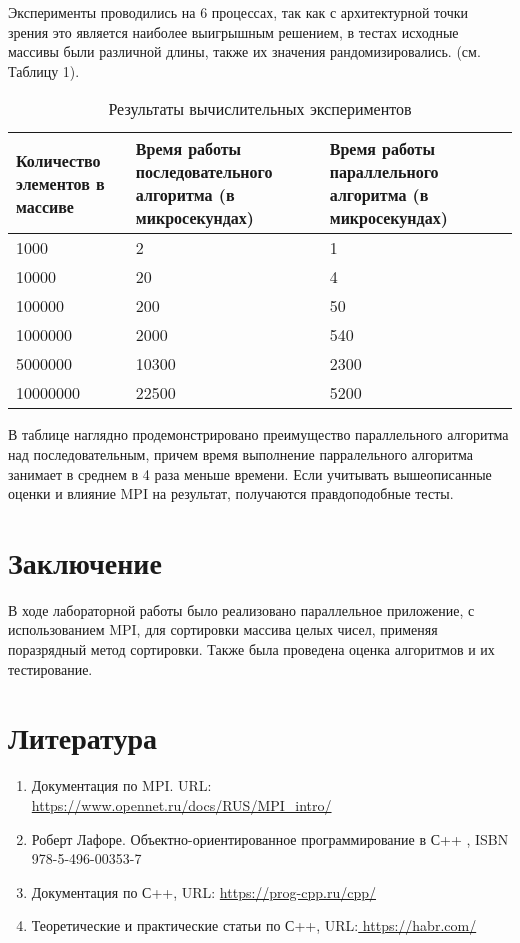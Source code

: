 \documentclass{report}
\begin{document}
\par Эксперименты проводились на 6 процессах, так как с архитектурной точки зрения это является наиболее выигрышным решением, в тестах исходные массивы были различной длины, также их значения рандомизировались. (см. Таблицу 1).

\begin{table}[!h]
\caption{Результаты вычислительных экспериментов}
\centering
\begin{tabular}{| p{2cm} | p{3cm} | p{4cm} | p{2cm} |}
\hline
Количество элементов в массиве & Время работы последовательного алгоритма (в микросекундах) & Время работы параллельного алгоритма (в микросекундах)  \\[5pt]
\hline
1000          & 2        & 1     \\
10000         & 20        & 4      \\
100000        & 200        & 50      \\
1000000       & 2000        & 540       \\
5000000       & 10300        & 2300        \\
10000000       & 22500        & 5200        \\
\hline
\end{tabular}
\end{table}

\par В таблице наглядно продемонстрировано преимущество параллельного алгоритма над последовательным, причем время выполнение парралельного алгоритма занимает в среднем в 4 раза меньше времени.
Если учитывать вышеописанные оценки и влияние MPI на результат, получаются правдоподобные тесты.

\newpage

\section*{Заключение}
В ходе лабораторной работы было реализовано параллельное приложение, с использованием MPI, для сортировки массива целых чисел, применяя поразрядный метод сортировки. Также была проведена оценка алгоритмов и их тестирование.
\newpage

\section*{Литература}
\begin{enumerate}
\item Документация по MPI. URL: \url{https://www.opennet.ru/docs/RUS/MPI_intro/}
\item Роберт Лафоре. Объектно-ориентированное программирование в С++ , ISBN 978-5-496-00353-7 
\item Документация по С++, URL: \url{https://prog-cpp.ru/cpp/}
\item Теоретические и практические статьи по С++, URL:\url{ https://habr.com/}
\end{enumerate} 
\newpage
\end{document}
